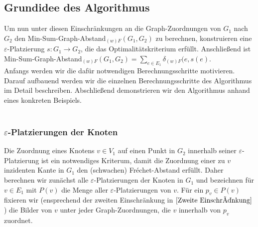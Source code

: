\documentclass[a4paper, 12pt, twoside]{article}
\theoremstyle{Format1} %
\begin{document}
\subsection{Grundidee des Algorithmus}
Um nun unter diesen Einschränkungen an die Graph-Zuordnungen von $G_1$ nach $G_2$ den Min-Sum-Graph-Abstand$_{(w)F}(G_1,G_2)$ zu berechnen, konstruieren
eine $\varepsilon$-Platzierung $s: G_1 \to G_2$, die das Optimalitätskriterium erfüllt.
Anschließend ist Min-Sum-Graph-Abstand$_{(w)F}(G_1,G_2) = \sum_{e \in E_1}\delta_{(w)F}(e, s(e)$.
\\
Anfangs werden wir die dafür notwendigen Berechnungsschritte motivieren.
Darauf aufbauend werden wir die einzelnen Berechnungsschritte des Algorithmus im Detail beschreiben.
Abschließend demonstrieren wir den Algorithmus anhand eines konkreten Beispiels.
\\
\\
\subsubsection{$\varepsilon$-Platzierungen der Knoten}
Die Zuordnung eines Knotens $v \in V_1$ auf einen Punkt in $G_2$ innerhalb seiner $\varepsilon$-Platzierung ist ein notwendiges Kriterum, damit die Zuordnung
einer zu $v$ inzidenten Kante in $G_1$ den (schwachen) Fréchet-Abstand erfüllt.
Daher berechnen wir zunächst alle $\varepsilon$-Platzierungen der Knoten in $G_1$ und bezeichnen für $v \in E_1$ mit $P(v)$ die Menge aller $\varepsilon$-Platzierungen von $v$.
Für ein $p_v \in P(v)$ fixieren wir (ensprechend der zweiten Einschränkung in $\ref{Zweite Einschränkung}$) die Bilder von $v$ unter jeder Graph-Zuordnungen,
die $v$ innerhalb von $p_v$ zuordnet.
\end{document}
